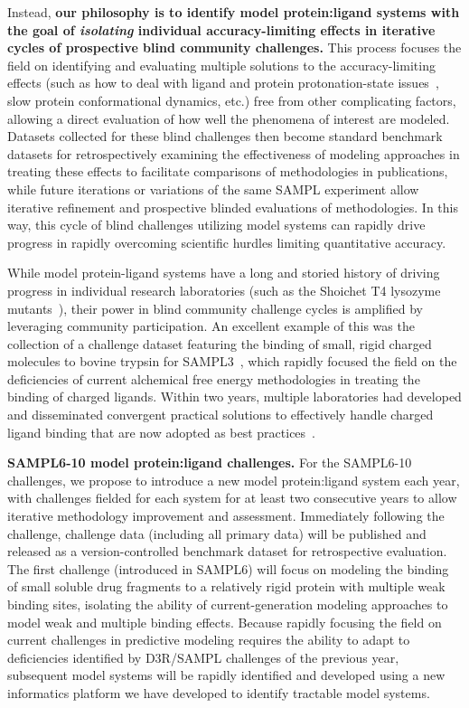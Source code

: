 \documentclass[11pt]{article}
\begin{document}
Instead, {\bf our philosophy is to identify model protein:ligand systems with the goal of \emph{isolating} individual accuracy-limiting effects in iterative cycles of prospective blind community challenges.}
This process focuses the field on identifying and evaluating multiple solutions to the accuracy-limiting effects (such as how to deal with ligand and protein protonation-state issues~\cite{Onufriev:2013:QuarterlyReviewsofBiophysics}, slow protein conformational dynamics, etc.) free from other complicating factors, allowing a direct evaluation of how well the phenomena of interest are modeled.
Datasets collected for these blind challenges then become standard benchmark datasets for retrospectively examining the effectiveness of modeling approaches in treating these effects to facilitate comparisons of methodologies in publications, while future iterations or variations of the same SAMPL experiment allow iterative refinement and prospective blinded evaluations of methodologies.
In this way, this cycle of blind challenges utilizing model systems can rapidly drive progress in rapidly overcoming scientific hurdles limiting quantitative accuracy.

While model protein-ligand systems have a long and storied history of driving progress in individual research laboratories (such as the Shoichet T4 lysozyme mutants~\cite{shoichet}), their power in blind community challenge cycles is amplified by leveraging community participation.
An excellent example of this was the collection of a challenge dataset featuring the binding of small, rigid charged molecules to bovine trypsin for SAMPL3~\cite{Newman:2011:JComputAidedMolDes}, which rapidly focused the field on the deficiencies of current alchemical free energy methodologies in treating the binding of charged ligands.
Within two years, multiple laboratories had developed and disseminated convergent practical solutions to effectively handle charged ligand binding that are now adopted as best practices~\cite{Rocklin:2013:TheJournalofChemicalPhysicsb,Reif:2014:JournalofComputationalChemistrya}.

{\bf SAMPL6-10 model protein:ligand challenges.} For the SAMPL6-10 challenges, we propose to introduce a new model protein:ligand system each year, with challenges fielded for each system for at least two consecutive years to allow iterative methodology improvement and assessment.
Immediately following the challenge, challenge data (including all primary data) will be published and released as a version-controlled benchmark dataset for retrospective evaluation.
The first challenge (introduced in SAMPL6) will focus on modeling the binding of small soluble drug fragments to a relatively rigid protein with multiple weak binding sites, isolating the ability of current-generation modeling approaches to model weak and multiple binding effects.
Because rapidly focusing the field on current challenges in predictive modeling requires the ability to adapt to deficiencies identified by D3R/SAMPL challenges of the previous year, subsequent model systems will be rapidly identified and developed using a new informatics platform we have developed to identify tractable model systems.
\end{document}
